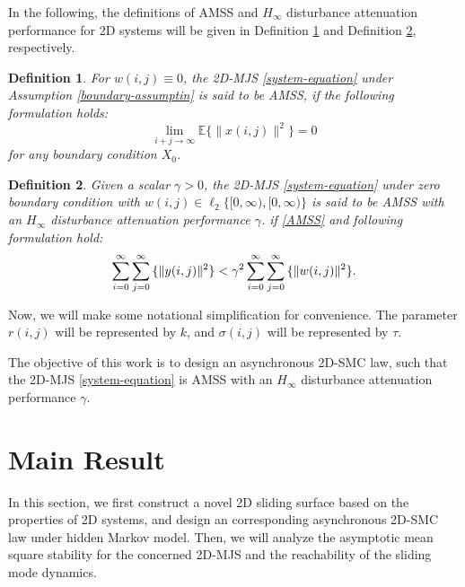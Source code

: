 \documentclass[journal,final,twocolumn]{IEEEtran}
\newtheorem{definition}{Definition}
\begin{document}
	In the following, the definitions of  AMSS and $H_{\infty}$ disturbance attenuation performance for 2D systems will be given in Definition \ref{mean-square-stable} and Definition \ref{H_infty-performance}, respectively.
	
	\begin{definition}\label{mean-square-stable}
	For $w(i,j)\equiv0$, the 2D-MJS \eqref{system-equation} under Assumption \ref{boundary-assumptin} is said to be AMSS,  if the following formulation holds:
	\begin{equation}\label{AMSS}
			\lim\limits_{i+j\to\infty}\mathbb{E}\{\|x(i,j)\|^{2}\} = 0
	\end{equation}
	for any boundary condition $X_{0}$.
	\end{definition}


	\begin{definition}\label{H_infty-performance}
		Given a scalar $\gamma>0$,  the 2D-MJS \eqref{system-equation} under zero boundary condition with $w(i,j)\in \ell_{2}\{[0,\infty),[0,\infty)\}$ is said to be AMSS with an $H_{\infty}$ disturbance attenuation performance $\gamma$. if \eqref{AMSS} and following formulation hold:
		\begin{equation} \label{invDef2}
			\sum_{i=0}^{\infty}\sum_{j=0}^{\infty}\mathbb\{\|y(i,j)\|^{2}\} <  \gamma^{2} \sum_{i=0}^{\infty}\sum_{j=0}^{\infty}\mathbb\{\|w(i,j)\|^{2}\}.
		\end{equation}
	\end{definition}
	
	Now, we will make some notational simplification for convenience. The parameter $r(i,j)$ will be represented by $k$, and $\sigma(i,j)$ will be represented by $\tau$. 
	
	 The objective of this work is to design an asynchronous  2D-SMC law, such that the 2D-MJS \eqref{system-equation} is AMSS with an $H_{\infty}$ disturbance attenuation performance $\gamma$. 

\section{Main Result}
In this section, we first construct a novel 2D sliding surface based on the properties of 2D systems, and design an  corresponding  asynchronous 2D-SMC law under hidden Markov model.  Then, we will analyze the asymptotic mean square stability for the concerned 2D-MJS and the reachability of the sliding mode dynamics.
\end{document}
